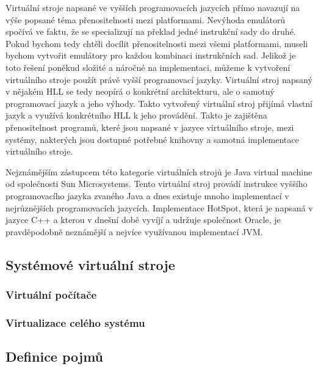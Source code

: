     Virtuální stroje napsané ve vyšších programovacích jazycích přímo navazují na výše popsané téma přenositelnosti mezi platformami. Nevýhoda emulátorů spočívá ve faktu, že se specializují na překlad jedné instrukční sady
    do druhé. Pokud bychom tedy chtěli docílit přenositelnosti mezi všemi platformami, museli bychom vytvořit emulátory pro každou kombinaci instrukčních sad. Jelikož je toto řešení poněkud složité a náročné na
    implementaci, můžeme k vytvoření virtuálního stroje použít právě vyšší programovací jazyky. Virtuální stroj napsaný v nějakém HLL se tedy neopírá o konkrétní architekturu, ale o samotný programovací jazyk a jeho výhody.
    Takto vytvořený virtuální stroj přijímá vlastní jazyk a využívá konkrétního HLL k jeho provádění. Takto je zajištěna přenositelnost programů, které jsou napsané v jazyce virtuálního stroje, mezi systémy, nakterých jsou dostupné
    potřebné knihovny a samotná implementace virtuálního stroje.
    
    Nejznámějším zástupcem této kategorie virtuálních strojů je Java virtual machine od společnosti Sun Microsystems. Tento virtuální stroj provádí instrukce vyššího programovacího jazyka zvaného Java a dnes existuje mnoho
    implementací v nejrůznějších programovacích jazycích. Implementace HotSpot, která je napsaná v jazyce C++ a kterou v dnešní době vyvíjí a udržuje společnost Oracle, je pravděpodobně neznámější a nejvíce využívanou
    implementací JVM.
    
  \subsection{Systémové virtuální stroje}
  \label{subsection:system_vm}
  
  
  
    \subsubsection*{Virtuální počítače}
    \subsubsection*{Virtualizace celého systému}
    \subsubsection*{}
  
  
  \subsection{Definice pojmů}
  \label{definitions}

